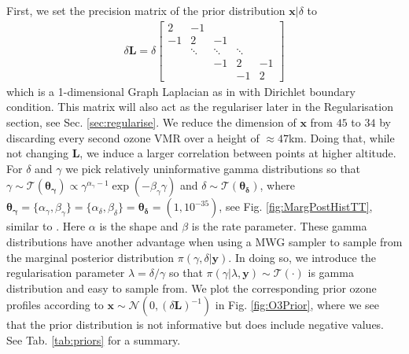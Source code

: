 First, we set the precision matrix of the prior distribution $\bm{x}|\delta$ to
\begin{align}
	\delta \bm{L} =
	\delta
	\begin{bmatrix}
		2 & -1 & & &  \\
		-1 & 2 & -1 & &   \\
		& \ddots & \ddots & \ddots &\\ 
		& & -1 & 2 & -1  \\
		& & & -1 & 2 
	\end{bmatrix} 
	\label{eq:GLapl} 
\end{align}
which is a 1-dimensional Graph Laplacian as in \cite{wang2015graphs,fox2016fast} with Dirichlet boundary condition.
This matrix will also act as the regulariser later in the Regularisation section, see Sec. \ref{sec:regularise}.
We reduce the dimension of $\bm{x}$ from $45$ to $34$ by discarding every second ozone VMR over a height of $\approx47$km.
Doing that, while not changing $\bm{L}$, we induce a larger correlation between points at higher altitude.
For $\delta$ and $\gamma$ we pick  relatively uninformative gamma distributions so that $\gamma \sim \mathcal{T}(\bm{\theta_{\gamma}}) \propto \gamma^{\alpha_\gamma -1 } \exp{( -\beta_\gamma \gamma) } $ and $\delta \sim \mathcal{T}(\bm{\theta_{\delta}})$, where $\bm{\theta_{\gamma}} = \{  \alpha_\gamma, \beta_\gamma\}  = \{ \alpha_\delta ,\beta_\delta\} = \bm{\theta_{\delta}} = (1,10^{-35})$, see Fig. \ref{fig:MargPostHistTT}, similar to \cite{fox2016fast}.
Here $ \alpha$ is the shape and $\beta$ is the rate parameter.
These gamma distributions have another advantage when using a MWG sampler to sample from the marginal posterior distribution $\pi(\gamma,\delta | \bm{y})$.
In doing so, we introduce the regularisation parameter $\lambda = \delta / \gamma $ so that $\pi(\gamma | \lambda, \bm{y}) \sim \mathcal{T}(\cdot)$ is gamma distribution and easy to sample from.
We plot the corresponding prior ozone profiles according to $\bm{x}\sim \mathcal{N}(0, (\delta \bm{L})^{-1})$ in Fig. \ref{fig:O3Prior}, where we see that the prior distribution is not informative but does include negative values.
See Tab. \ref{tab:priors} for a summary. 



